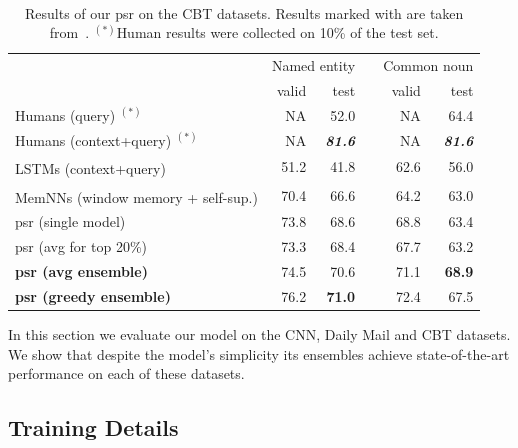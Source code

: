 \documentclass[11pt]{article}
\newcommand{\ddg}{\textsuperscript{\ddag}}
\begin{document}
\begin{table}[ht!]
\end{table}

\begin{table}[th!]
\centering
  \begin{tabular}{@{}l@{}rr@{}l@{}rr@{}}
    \toprule
    & \multicolumn{2}{c}{Named entity} &\phantom{aa}& \multicolumn{2}{c}{Common noun} \\
    \cmidrule{2-3} \cmidrule{5-6}
    & valid & test && valid & test \\
    \midrule
        Humans (query) $^{(*)}$ & NA & 52.0 &&  NA & 64.4 \\ %
        Humans (context+query) $^{(*)}$ &NA &{\it \textbf{81.6}} && NA & {\it \textbf{ 81.6}} \\ %
        \midrule
        LSTMs (context+query) \ddg & 51.2 & 41.8 && 62.6 & 56.0 \\ %
        \midrule
        MemNNs  (window memory + self-sup.) \ddg & 70.4 & 66.6 &&  64.2 &  63.0 \\ %
        \midrule
        \gls{psr} (single model)     & 73.8 & 68.6 && 68.8 & 63.4 \\ %
        \gls{psr} (avg for top 20\%)     & 73.3 & 68.4 && 67.7 & 63.2 \\ %
        \bf{\gls{psr} (avg ensemble)}     & 74.5 &  70.6 && 71.1 & \bf 68.9 \\
        \bf{\gls{psr} (greedy ensemble)}     &  76.2 & \bf 71.0 &&  72.4 &  67.5 \\
     \bottomrule
  \end{tabular}
\caption{Results of our \gls{psr} on the CBT datasets. Results marked with \ddg{} are taken
from~\protect\cite{hill2015goldilocks}. $^{(*)}$Human results were collected on 10\% of the test set.}
\label{tab:results-cbt}
\end{table}

In this section we evaluate our model on the CNN, Daily Mail and CBT datasets. We show that despite the model's simplicity its ensembles achieve state-of-the-art performance on each of these datasets.

\subsection{Training Details}
\end{document}
